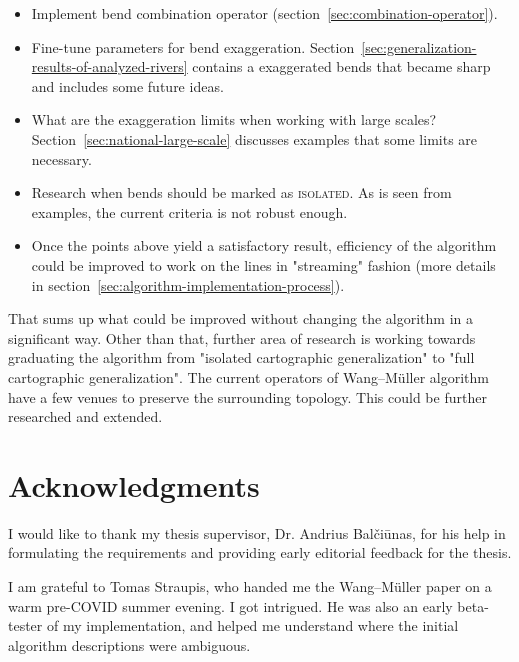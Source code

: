 \documentclass[a4paper]{article}
\newcommand{\WM}{Wang--M{\"u}ller}
\begin{document}
\begin{itemize}

    \item Implement bend combination operator
        (section~\ref{sec:combination-operator}).

    \item Fine-tune parameters for bend exaggeration.
        Section~\ref{sec:generalization-results-of-analyzed-rivers} contains
        a exaggerated bends that became sharp and includes some future ideas.

    \item What are the exaggeration limits when working with large scales?
        Section~\ref{sec:national-large-scale} discusses examples that some
        limits are necessary.

    \item Research when bends should be marked as \textsc{isolated}. As is
        seen from examples, the current criteria is not robust enough.

    \item Once the points above yield a satisfactory result, efficiency of the
        algorithm could be improved to work on the lines in "streaming" fashion
        (more details in section~\ref{sec:algorithm-implementation-process}).

\end{itemize}

That sums up what could be improved without changing the algorithm in a
significant way. Other than that, further area of research is working towards
graduating the algorithm from "isolated cartographic generalization" to "full
cartographic generalization".  The current operators of {\WM} algorithm have a
few venues to preserve the surrounding topology. This could be further
researched and extended.

\section{Acknowledgments}
\label{sec:acknowledgments}

I would like to thank my thesis supervisor, Dr. Andrius Balčiūnas, for his help
in formulating the requirements and providing early editorial feedback for the
thesis.

I am grateful to Tomas Straupis, who handed me the {\WM}\cite{wang1998line}
paper on a warm pre-COVID summer evening. I got intrigued. He was also an early
beta-tester of my implementation, and helped me understand where the initial
algorithm descriptions were ambiguous.
\end{document}
